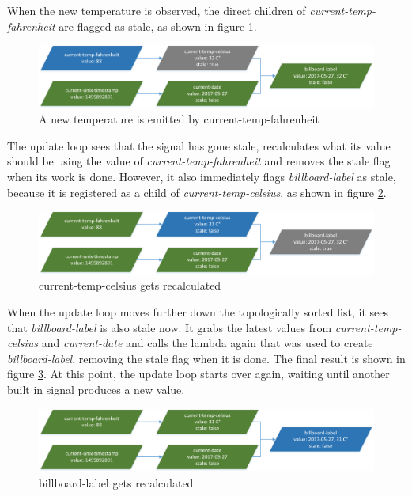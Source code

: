 When the new temperature is observed, the direct children of \textit{current-temp-fahrenheit} are flagged as stale, as shown in figure \ref{fig:language-frdataflow-2}.

\begin{figure}[h]
	\centerline{\includegraphics[width=\textwidth]{images/language-frdataflow-2.png}}
	\caption{A new temperature is emitted by current-temp-fahrenheit}
	\label{fig:language-frdataflow-2}
\end{figure}

The update loop sees that the signal has gone stale, recalculates what its value should be using the value of \textit{current-temp-fahrenheit} and removes the stale flag when its work is done.
However, it also immediately flags \textit{billboard-label} as stale, because it is registered as a child of \textit{current-temp-celsius}, as shown in figure \ref{fig:language-frdataflow-3}.

\begin{figure}[h]
	\centerline{\includegraphics[width=\textwidth]{images/language-frdataflow-3.png}}
	\caption{current-temp-celsius gets recalculated}
	\label{fig:language-frdataflow-3}
\end{figure}

When the update loop moves further down the topologically sorted list, it sees that \textit{billboard-label} is also stale now. It grabs the latest values from \textit{current-temp-celsius} and \textit{current-date} and calls the lambda again that was used to create \textit{billboard-label}, removing the stale flag when it is done. The final result is shown in figure \ref{fig:language-frdataflow-4}. 
At this point, the update loop starts over again, waiting until another built in signal produces a new value. 

\begin{figure}[h]
	\centerline{\includegraphics[width=\textwidth]{images/language-frdataflow-4.png}}
	\caption{billboard-label gets recalculated}
	\label{fig:language-frdataflow-4}
\end{figure}

